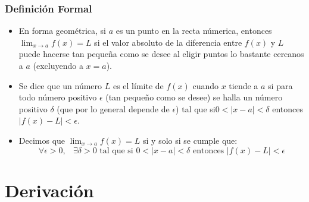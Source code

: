\documentclass[12pt, fleqn]{report}                             %
\DeclareMathOperator \Space {\quad}                             %
\DeclareMathOperator \MiniSpace {\;}                            %
\begin{document}
            \subsection{Definición Formal}

                \begin{itemize}

                    \item
                        En forma geométrica, si $a$ es un punto en la recta númerica, entonces
                        $\lim_{x \to a} f(x) = L$ si el valor absoluto de la diferencia entre
                        $f(x)$ y $L$ puede hacerse tan pequeña como se desee al eligir puntos
                        lo bastante cercanos a $a$ (excluyendo a $x = a$).

                    \item
                        Se dice que un número $L$ es el límite de $f(x)$ cuando $x$ tiende a $a$
                        si para todo número positivo $\epsilon$ (tan pequeño como se desee) se
                        halla un número positivo $\delta$ (que por lo general depende de $\epsilon$)
                        tal que si$0 < |x - a| < \delta$ entonces $|f(x) - L| < \epsilon$.

                    \item 
                        Decimos que $\lim_{x \to a} f(x) = L$ si y solo si se cumple que:
                        \begin{equation*}
                            \forall \epsilon > 0, \MiniSpace
                                \exists \delta > 0 \text{ tal que si }
                                    0 < |x - a| < \delta \text{ entonces } |f(x) - L| < \epsilon 
                        \end{equation*}

                \end{itemize}


               


    \chapter{Derivación}
        \clearpage
\end{document}
